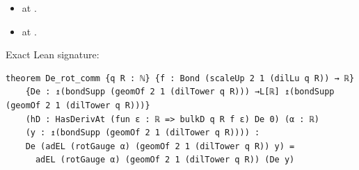 \begin{theorem}[bp-328]
\begin{itemize}
\item \texttt{} at \texttt{}.
\item \texttt{} at \texttt{}.
\end{itemize}
\par Exact Lean signature:
\begin{verbatim}
theorem De_rot_comm {q R : ℕ} {f : Bond (scaleUp 2 1 (dilLu q R)) → ℝ}
    {De : ↥(bondSupp (geomOf 2 1 (dilTower q R))) →L[ℝ] ↥(bondSupp (geomOf 2 1 (dilTower q R)))}
    (hD : HasDerivAt (fun ε : ℝ => bulkD q R f ε) De 0) (α : ℝ)
    (y : ↥(bondSupp (geomOf 2 1 (dilTower q R)))) :
    De (adEL (rotGauge α) (geomOf 2 1 (dilTower q R)) y) =
      adEL (rotGauge α) (geomOf 2 1 (dilTower q R)) (De y)
\end{verbatim}
\end{theorem}

